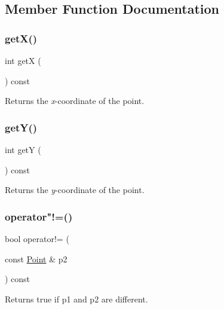 \subsection{Member Function Documentation}
\mbox{\label{classPoint_ae6902baa2934561358fc7f8f3852d4f6}} 
\subsubsection{\texorpdfstring{get\+X()}{getX()}}
{\footnotesize\ttfamily int getX (\begin{DoxyParamCaption}{ }\end{DoxyParamCaption}) const}



Returns the {\itshape x}-\/coordinate of the point. 

\mbox{\label{classPoint_afaf0a0403410a186997c1477e8bf6897}} 
\subsubsection{\texorpdfstring{get\+Y()}{getY()}}
{\footnotesize\ttfamily int getY (\begin{DoxyParamCaption}{ }\end{DoxyParamCaption}) const}



Returns the {\itshape y}-\/coordinate of the point. 

\mbox{\label{classPoint_ad62a7cee20e8e65bdf44b395d3df3e1b}} 
\subsubsection{\texorpdfstring{operator"!=()}{operator!=()}}
{\footnotesize\ttfamily bool operator!= (\begin{DoxyParamCaption}\item[{const \mbox{\hyperlink{classPoint}{Point}} \&}]{p2 }\end{DoxyParamCaption}) const}



Returns {\ttfamily true} if {\ttfamily p1} and {\ttfamily p2} are different. 

